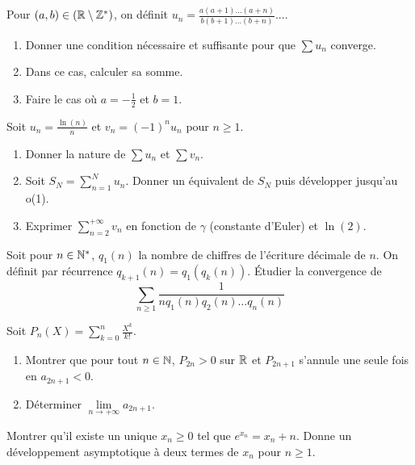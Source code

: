 \begin{exercise}
	Pour $(a,b)\in(\mathbb{R}\setminus\mathbb{Z}^{*})$, on définit
	$u_{n}=\frac{a(a+1)\dots(a+n)}{b(b+1)\dots(b+n)}$....
	\begin{enumerate}
		\item
		Donner une condition nécessaire et suffisante pour que $\sum u_{n}$
		converge.
		\item
		Dans ce cas, calculer sa somme.
		\item
		Faire le cas où $a=-\frac{1}{2}$ et $b=1$.
	\end{enumerate}
\end{exercise}

\begin{exercise}
	Soit $u_{n}=\frac{\ln(n)}{n}$ et $v_{n}=(-1)^{n}u_{n}$ pour $n\geqslant1$.
	\begin{enumerate}
		\item
		Donner la nature de $\sum u_{n}$ et $\sum v_{n}$.
		\item
		Soit $S_{N}=\sum_{n=1}^{N}u_{n}$. Donner un équivalent de $S_{N}$ puis
		développer jusqu'au o(1).
		\item
		Exprimer $\sum_{n=2}^{+\infty}v_{n}$ en fonction de $\gamma$ (constante
		d'Euler) et $\ln(2)$.
	\end{enumerate}
\end{exercise}

\begin{exercise}
	Soit pour $n\in\mathbb{N}^{*}$, $q_{1}(n)$ la nombre de chiffres de l'écriture
	décimale de $n$. On définit par récurrence $q_{k+1}(n)=q_{1}(q_{k}(n))$.
	Étudier la convergence de 
	$$\sum_{n\geqslant1}\frac{1}{nq_{1}(n)q_{2}(n)\dots q_{n}(n)}$$
\end{exercise}

\begin{exercise}
	Soit $P_{n}(X)=\sum_{k=0}^{n}\frac{X^{k}}{k!}$.
	\begin{enumerate}
		\item
		Montrer que pour tout $n\in\mathbb{N}$, $P_{2n}>0$ sur $\mathbb{R}$ et $P_{2n+1}$ s'annule
		une seule fois en $a_{2n+1}<0$.
		\item
		Déterminer $\lim\limits_{n\to+\infty}a_{2n+1}$.
	\end{enumerate}
\end{exercise}

\begin{exercise}
	Montrer qu'il existe un unique $x_{n}\geqslant0$ tel que $e^{x_{n}}=x_{n}+n$.
	Donne un développement asymptotique à deux termes de $x_{n}$ pour
	$n\geqslant1$.
\end{exercise}

